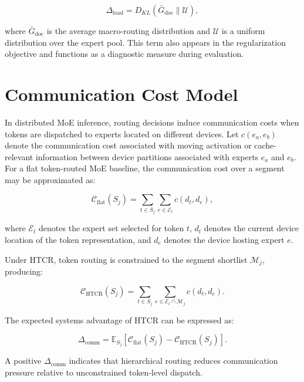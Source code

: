 \begin{equation}
\Delta_{\text{load}} =
D_{KL}\left(\bar{G}_{\text{doc}} \parallel \mathcal{U}\right),
\end{equation}

where $\bar{G}_{\text{doc}}$ is the average macro-routing distribution and $\mathcal{U}$ is a uniform distribution over the expert pool. This term also appears in the regularization objective and functions as a diagnostic measure during evaluation.

\section{Communication Cost Model}

In distributed MoE inference, routing decisions induce communication costs when tokens are dispatched to experts located on different devices. Let $c(e_a,e_b)$ denote the communication cost associated with moving activation or cache-relevant information between device partitions associated with experts $e_a$ and $e_b$. For a flat token-routed MoE baseline, the communication cost over a segment may be approximated as:

\begin{equation}
\mathcal{C}_{\text{flat}}(S_j)
=
\sum_{t \in S_j}
\sum_{e \in \mathcal{E}_t}
c(d_t, d_e),
\end{equation}

where $\mathcal{E}_t$ denotes the expert set selected for token $t$, $d_t$ denotes the current device location of the token representation, and $d_e$ denotes the device hosting expert $e$.

Under HTCR, token routing is constrained to the segment shortlist $\mathcal{M}_j$, producing:

\begin{equation}
\mathcal{C}_{\text{HTCR}}(S_j)
=
\sum_{t \in S_j}
\sum_{e \in \mathcal{E}_t \cap \mathcal{M}_j}
c(d_t, d_e).
\end{equation}

The expected systems advantage of HTCR can be expressed as:

\begin{equation}
\Delta_{\text{comm}}
=
\mathbb{E}_{S_j}
\left[
\mathcal{C}_{\text{flat}}(S_j)
-
\mathcal{C}_{\text{HTCR}}(S_j)
\right].
\end{equation}

A positive $\Delta_{\text{comm}}$ indicates that hierarchical routing reduces communication pressure relative to unconstrained token-level dispatch.

